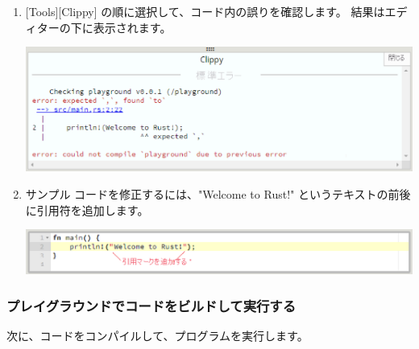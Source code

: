 \begin{enumerate}
\item $[$Tools][Clippy] の順に選択して、コード内の誤りを確認します。 結果はエディターの下に表示されます。

\includegraphics[width=14cm]{rust-playground-clippy.eps}

\item サンプル コードを修正するには、"Welcome to Rust!" というテキストの前後に引用符を追加します。

\includegraphics[width=14cm]{rust-playground-add-quotes.eps}

\end{enumerate}


\subsubsection{プレイグラウンドでコードをビルドして実行する}

次に、コードをコンパイルして、プログラムを実行します。

